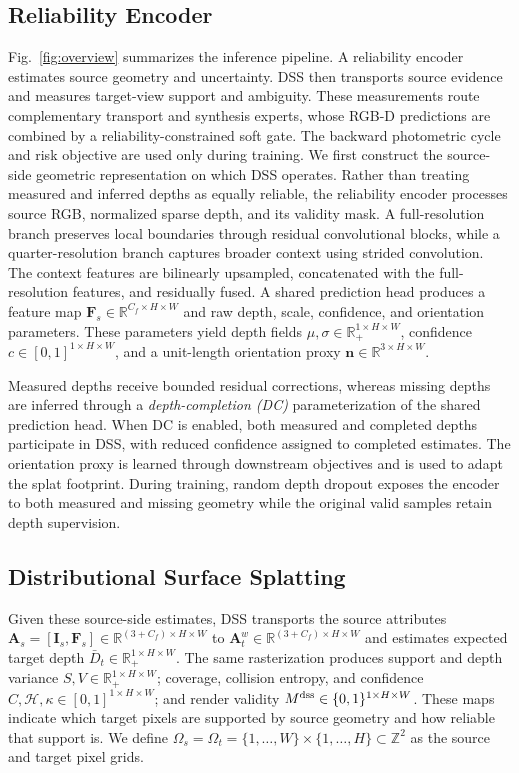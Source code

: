 \documentclass[letterpaper,10pt,conference]{ieeeconf}
\newcommand{\R}{\mathbb{R}}
\newcommand{\I}{\mathbf{I}}
\newcommand{\F}{\mathbf{F}}
\newcommand{\n}{\mathbf{n}}
\begin{document}
\subsection{Reliability Encoder}

Fig.~\ref{fig:overview} summarizes the inference pipeline. A
reliability encoder estimates source geometry and uncertainty. DSS then transports source evidence and measures target-view
support and ambiguity. These measurements route complementary transport and
synthesis experts, whose RGB-D predictions are combined by a
reliability-constrained soft gate. The backward photometric cycle and risk objective
are used only during training.
We first construct the source-side geometric representation on which DSS
operates. Rather than treating measured and inferred depths as equally
reliable, the reliability encoder processes source RGB, normalized sparse
depth, and its validity mask. A full-resolution branch preserves local
boundaries through residual convolutional blocks, while a quarter-resolution
branch captures broader context using strided convolution. The context features
are bilinearly upsampled, concatenated with the full-resolution features, and
residually fused. A shared prediction head produces a feature map
$\F_s\in\R^{C_f\times H\times W}$ and raw depth, scale, confidence, and
orientation parameters. These parameters yield depth fields
$\mu,\sigma\in\R_+^{1\times H\times W}$, confidence
$c\in[0,1]^{1\times H\times W}$, and a unit-length orientation proxy
$\n\in\R^{3\times H\times W}$.

Measured depths receive bounded residual corrections, whereas missing depths
are inferred through a \emph{depth-completion (DC)} parameterization of the
shared prediction head. When DC is enabled, both measured and completed depths
participate in DSS, with reduced confidence assigned to completed estimates.
The orientation proxy is learned through downstream objectives and is used
to adapt the splat footprint. During training, random depth dropout exposes the
encoder to both measured and missing geometry while the original valid samples
retain depth supervision.

\subsection{Distributional Surface Splatting}

Given these source-side estimates, DSS transports the source attributes
$\mathbf A_s=[\I_s,\F_s]\in\R^{(3+C_f)\times H\times W}$ to
$\mathbf A_t^w\in\R^{(3+C_f)\times H\times W}$ and estimates expected target
depth $\bar D_t\in\R_+^{1\times H\times W}$. The same rasterization produces
support and depth variance $S,V\in\R_+^{1\times H\times W}$; coverage,
collision entropy, and confidence
$C,\mathcal H,\kappa\in[0,1]^{1\times H\times W}$; and render validity
$M^{\rm dss}\in\{0,1\}^{1\times H\times W}$.
These maps indicate which target pixels are 
supported by source geometry and how reliable that support is. We define
$\Omega_s=\Omega_t=\{1,\ldots,W\}\times\{1,\ldots,H\}
\subset\mathbb Z^2$ as the source and target pixel grids. 
\end{document}
